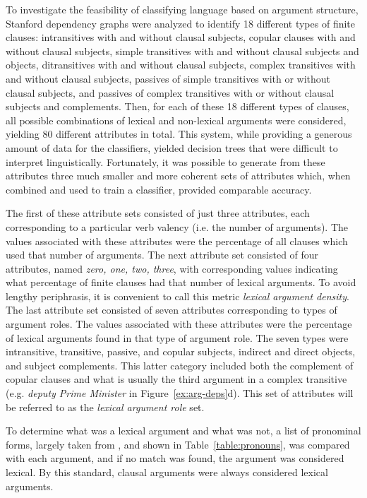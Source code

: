 \documentclass[main.tex]{subfiles}
\begin{document}
To investigate the feasibility of classifying language based on argument structure, Stanford dependency graphs were analyzed to identify 18 different types of finite clauses: intransitives with and without clausal subjects, copular clauses with and without clausal subjects, simple transitives with and without clausal subjects and objects, ditransitives with and without clausal subjects, complex transitives with and without clausal subjects, passives of simple transitives with or without clausal subjects, and passives of complex transitives with or without clausal subjects and complements. Then, for each of these 18 different types of clauses, all possible combinations of lexical and non-lexical arguments were considered, yielding 80 different attributes in total. This system, while providing a generous amount of data for the classifiers, yielded decision trees that were difficult to interpret linguistically. Fortunately, it was possible to generate from these attributes three much smaller and more coherent sets of attributes which, when combined and used to train a classifier, provided comparable accuracy.

The first of these attribute sets consisted of just three attributes, each corresponding to a particular verb valency (i.e. the number of arguments). The values associated with these attributes were the percentage of all clauses which used that number of arguments. The next attribute set consisted of four attributes, named \textit{zero, one, two, three}, with corresponding values indicating what percentage of finite clauses had that number of lexical arguments. To avoid lengthy periphrasis, it is convenient to call this metric \textit{lexical argument density}.  The last attribute set consisted of seven attributes corresponding to types of argument roles. The values associated with these attributes were the percentage of lexical arguments found in that type of argument role. The seven types were intransitive, transitive, passive, and copular subjects, indirect and direct objects, and subject complements. This latter category included both the complement of copular clauses and what is usually the third argument in a complex transitive (e.g. \textit{deputy Prime Minister} in Figure~\ref{ex:arg-deps}d). This set of attributes will be referred to as the \textit{lexical argument role} set.

To determine what was a lexical argument and what was not, a list of pronominal forms, largely taken from \citet[pp. 298-300]{celce-murcia:1999}, and shown in Table~\ref{table:pronouns}, was compared with each argument, and if no match was found, the argument was considered lexical. By this standard, clausal arguments were always considered lexical arguments. 
\end{document}
